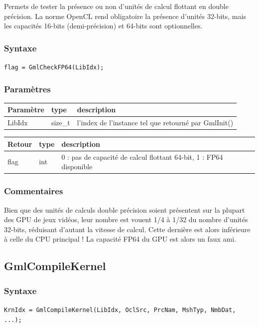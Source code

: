 \documentclass[a4paper,12pt]{article}
\begin{document}
Permets de tester la présence ou non d'unités de calcul flottant en double précision.
La norme OpenCL rend obligatoire la présence d'unités 32-bits, mais les capacités 16-bits (demi-précision) et 64-bits sont optionnelles.

\subsubsection*{Syntaxe}
{\tt flag = GmlCheckFP64(LibIdx);}
\subsubsection*{Paramètres}

\begin{tabular}{|m{2cm}|m{1.5cm}|m{10.5cm}|}
\hline
Paramètre  & type    & description \\
\hline
LibIdx     & size\_t & l'index de l'instance tel que retourné par GmlInit() \\
\hline
\end{tabular}

\medskip

\begin{tabular}{|m{2cm}|m{1.5cm}|m{10.5cm}|}
\hline
Retour     & type   & description \\
\hline
flag       & int    & 0 : pas de capacité de calcul flottant 64-bit, 1 : FP64 disponible \\
\hline
\end{tabular}
\subsubsection*{Commentaires}
Bien que des unités de calculs double précision soient présentent sur la plupart des GPU de jeux vidéos, leur nombre est vouent 1/4 à 1/32 du nombre d'unités 32-bits, réduisant d'autant la vitesse de calcul.
Cette dernière est alors inférieure à celle du CPU principal !
La capacité FP64 du GPU est alors un faux ami.


\subsection{GmlCompileKernel}

\subsubsection*{Syntaxe}

{\tt KrnIdx = GmlCompileKernel(LibIdx, OclSrc, PrcNam, MshTyp, NmbDat, ...);}
\end{document}
